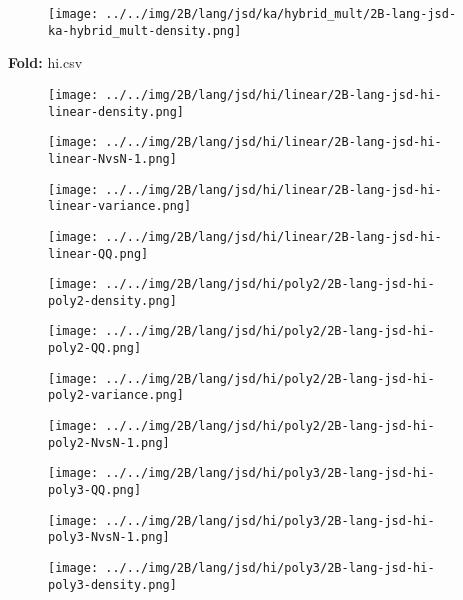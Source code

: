 \begin{figure}[H]
\centering	\texttt{[image: ../../img/2B/lang/jsd/ka/hybrid\_mult/2B-lang-jsd-ka-hybrid\_mult-density.png]}
\end{figure}
\textbf{Fold:} hi.csv
\begin{figure}[H]
\centering	\texttt{[image: ../../img/2B/lang/jsd/hi/linear/2B-lang-jsd-hi-linear-density.png]}
\end{figure}
\begin{figure}[H]
\centering	\texttt{[image: ../../img/2B/lang/jsd/hi/linear/2B-lang-jsd-hi-linear-NvsN-1.png]}
\end{figure}
\begin{figure}[H]
\centering	\texttt{[image: ../../img/2B/lang/jsd/hi/linear/2B-lang-jsd-hi-linear-variance.png]}
\end{figure}
\begin{figure}[H]
\centering	\texttt{[image: ../../img/2B/lang/jsd/hi/linear/2B-lang-jsd-hi-linear-QQ.png]}
\end{figure}
\begin{figure}[H]
\centering	\texttt{[image: ../../img/2B/lang/jsd/hi/poly2/2B-lang-jsd-hi-poly2-density.png]}
\end{figure}
\begin{figure}[H]
\centering	\texttt{[image: ../../img/2B/lang/jsd/hi/poly2/2B-lang-jsd-hi-poly2-QQ.png]}
\end{figure}
\begin{figure}[H]
\centering	\texttt{[image: ../../img/2B/lang/jsd/hi/poly2/2B-lang-jsd-hi-poly2-variance.png]}
\end{figure}
\begin{figure}[H]
\centering	\texttt{[image: ../../img/2B/lang/jsd/hi/poly2/2B-lang-jsd-hi-poly2-NvsN-1.png]}
\end{figure}
\begin{figure}[H]
\centering	\texttt{[image: ../../img/2B/lang/jsd/hi/poly3/2B-lang-jsd-hi-poly3-QQ.png]}
\end{figure}
\begin{figure}[H]
\centering	\texttt{[image: ../../img/2B/lang/jsd/hi/poly3/2B-lang-jsd-hi-poly3-NvsN-1.png]}
\end{figure}
\begin{figure}[H]
\centering	\texttt{[image: ../../img/2B/lang/jsd/hi/poly3/2B-lang-jsd-hi-poly3-density.png]}
\end{figure}
